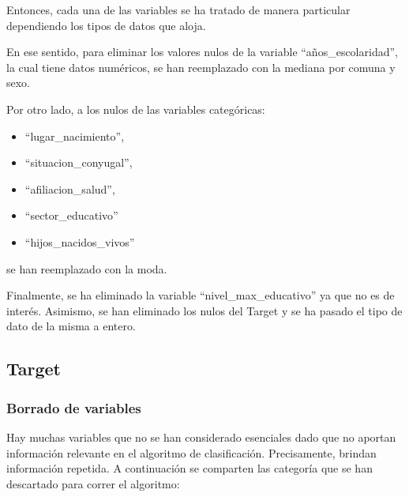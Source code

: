 \documentclass[a4paper]{article}
\begin{document}
        Entonces, cada una de las variables se ha tratado de manera particular dependiendo los tipos de datos que aloja.
        
\vspace{1cm}

        En ese sentido, para eliminar los valores nulos de la variable ``años\_escolaridad'', la cual tiene datos numéricos, se han reemplazado con la mediana por comuna y sexo.
        
\vspace{1cm}

        Por otro lado, a los nulos de las variables categóricas:
        \begin{itemize}
            \item ``lugar\_nacimiento'',
            \item ``situacion\_conyugal'',
            \item ``afiliacion\_salud'',
            \item ``sector\_educativo''
            \item ``hijos\_nacidos\_vivos''
        \end{itemize}
        se han reemplazado con la moda.
        
 \vspace{1cm}    
 
        Finalmente, se ha eliminado la variable ``nivel\_max\_educativo'' ya que no es de interés. Asimismo, se han eliminado los nulos del Target y se ha pasado el tipo de dato de la misma a entero. 
        

    \subsection{Target}

        \subsubsection{Borrado de variables}
    
        Hay muchas variables que no se han considerado esenciales dado que no aportan información relevante en el algoritmo de clasificación. Precisamente, brindan información repetida. A continuación se comparten las categoría que se han descartado para correr el algoritmo: 
\end{document}
